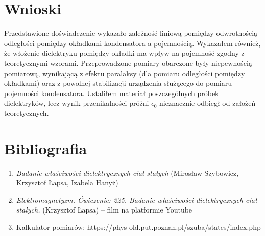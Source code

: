 \documentclass[polish, a4paper]{article}
\begin{document}
\section{Wnioski}

Przedstawione doświadczenie wykazało zależność liniową pomiędzy odwrotnością odległości pomiędzy okładkami kondensatora a pojemnością. Wykazałem również, że włożenie dielektryku pomiędzy okładki ma wpływ na pojemność zgodny z teoretycznymi wzorami. Przeprowadzone pomiary obarczone były niepewnością pomiarową, wynikającą z efektu paralaksy (dla pomiaru odległości pomiędzy okładkami) oraz z powolnej stabilizacji urządzenia służącego do pomiaru pojemności kondensatora. Ustaliłem materiał poszczególnych próbek dielektryków, lecz wynik przenikalności próżni $\epsilon_0$ nieznacznie odbiegł od założeń teoretycznych.    


\section{Bibliografia}

\begin{enumerate}
    \item {\emph{Badanie właściwości dielektrycznych ciał stałych} (Mirosław Szybowicz, Krzysztof Łapsa, Izabela Hanyż)}
    \item {\emph{Elektromagnetyzm. Ćwiczenie: 225. Badanie właściwości dielektrycznych ciał stałych.} (Krzysztof Łapsa) – film na platformie Youtube}
    \item {Kalkulator pomiarów: https://phys-old.put.poznan.pl/szuba/states/index.php}
\end{enumerate}
\end{document}
